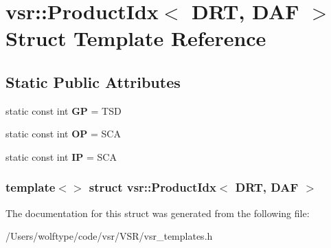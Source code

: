 \hypertarget{structvsr_1_1_product_idx_3_01_d_r_t_00_01_d_a_f_01_4}{\section{vsr\-:\-:Product\-Idx$<$ D\-R\-T, D\-A\-F $>$ Struct Template Reference}
\label{structvsr_1_1_product_idx_3_01_d_r_t_00_01_d_a_f_01_4}
}
\subsection*{Static Public Attributes}
\begin{DoxyCompactItemize}
\item 
\hypertarget{structvsr_1_1_product_idx_3_01_d_r_t_00_01_d_a_f_01_4_a943c73a32a9a8fc2f4ba2482daa7e3e8}{static const int {\bfseries G\-P} = T\-S\-D}\label{structvsr_1_1_product_idx_3_01_d_r_t_00_01_d_a_f_01_4_a943c73a32a9a8fc2f4ba2482daa7e3e8}

\item 
\hypertarget{structvsr_1_1_product_idx_3_01_d_r_t_00_01_d_a_f_01_4_a78c4318e837df53130c38b4507f5a2c6}{static const int {\bfseries O\-P} = S\-C\-A}\label{structvsr_1_1_product_idx_3_01_d_r_t_00_01_d_a_f_01_4_a78c4318e837df53130c38b4507f5a2c6}

\item 
\hypertarget{structvsr_1_1_product_idx_3_01_d_r_t_00_01_d_a_f_01_4_aa543481c35d26d4929fa6fd501a0c6be}{static const int {\bfseries I\-P} = S\-C\-A}\label{structvsr_1_1_product_idx_3_01_d_r_t_00_01_d_a_f_01_4_aa543481c35d26d4929fa6fd501a0c6be}

\end{DoxyCompactItemize}
\subsubsection*{template$<$$>$ struct vsr\-::\-Product\-Idx$<$ D\-R\-T, D\-A\-F $>$}



The documentation for this struct was generated from the following file\-:\begin{DoxyCompactItemize}
\item 
/\-Users/wolftype/code/vsr/\-V\-S\-R/vsr\-\_\-templates.\-h\end{DoxyCompactItemize}
